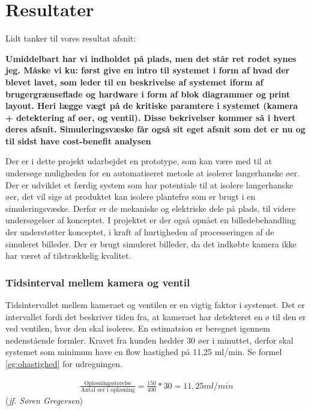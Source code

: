 \chapter{Resultater}
Lidt tanker til vores resultat afsnit:

\textbf{Umiddelbart har vi indholdet på plads, men det står ret rodet synes jeg. Måske vi ku: først give en intro til systemet i form af hvad der blevet lavet, som leder til en beskrivelse af systemet iform af brugergrænseflade og hardware i form af blok diagrammer og print layout. 
Heri lægge vægt på de kritiske paramtere i systemet (kamera + detektering af øer, og ventil).
Disse bekrivelser kommer så i hvert deres afsnit.
Simuleringsvæske får også sit eget afsnit som det er nu og til sidst have cost-benefit analysen} 







Der er i dette projekt udarbejdet en prototype, som kan være med til at undersøge muligheden for en automatiseret metode at isolerer langerhanske øer. Der er udviklet et færdig system som har potentiale til at isolere langerhanske øer, det vil sige at produktet kan isolere plantefrø som er brugt i en simuleringsvæske. Derfor er de mekaniske og elektriske dele på plads, til videre undersøgelser af konceptet. I projektet er der også opnået en billedebehandling der understøtter konceptet, i kraft af hurtigheden af processeringen af de simuleret billeder. Der er brugt simuleret billeder, da det indkøbte kamera ikke har været af tilstrækkelig kvalitet.


\subsection{Tidsinterval mellem kamera og ventil}
Tidsintervallet mellem kameraet og ventilen er en vigtig faktor i systemet. Det er   intervallet fordi det beskriver tiden fra, at kameraet har detekteret en ø til den er ved ventilen, hvor den skal isoleres. En estimatsion er beregnet igennem nedenstående formler. Kravet fra kunden hedder 30 øer i minuttet, derfor skal systemet som minimum have en flow hastighed på 11,25 ml/min. Se formel \ref{eg:ohastighed} for udregningen.

\begin{align}
\frac{\text{Opløsningsstørelse}}{\text{Antal øer i opløsning}} = \frac{150}{400}*30 = 11,25ml/min
\label{eg:ohastighed}
\end{align}(\textit{jf. Søren Gregersen})

